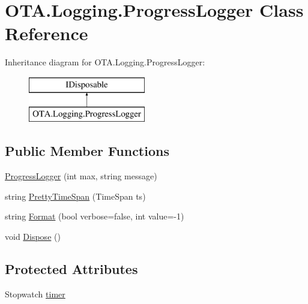 \hypertarget{class_o_t_a_1_1_logging_1_1_progress_logger}{}\section{O\+T\+A.\+Logging.\+Progress\+Logger Class Reference}
\label{class_o_t_a_1_1_logging_1_1_progress_logger}
Inheritance diagram for O\+T\+A.\+Logging.\+Progress\+Logger\+:\begin{figure}[H]
\begin{center}
\leavevmode
\includegraphics[height=2.000000cm]{class_o_t_a_1_1_logging_1_1_progress_logger}
\end{center}
\end{figure}
\subsection*{Public Member Functions}
\begin{DoxyCompactItemize}
\item 
\hyperlink{class_o_t_a_1_1_logging_1_1_progress_logger_aa52ea660c767acd827be13deef1fba14}{Progress\+Logger} (int max, string message)
\item 
string \hyperlink{class_o_t_a_1_1_logging_1_1_progress_logger_a442e642c90e9ebc2cb585fcad888b36d}{Pretty\+Time\+Span} (Time\+Span ts)
\item 
string \hyperlink{class_o_t_a_1_1_logging_1_1_progress_logger_ad3824caa6aefead3a811b03c17dbea1d}{Format} (bool verbose=false, int value=-\/1)
\item 
void \hyperlink{class_o_t_a_1_1_logging_1_1_progress_logger_a2ac8f3630b87201732790bf5cd216361}{Dispose} ()
\end{DoxyCompactItemize}
\subsection*{Protected Attributes}
\begin{DoxyCompactItemize}
\item 
Stopwatch \hyperlink{class_o_t_a_1_1_logging_1_1_progress_logger_a9c45af0d8924b901b14f8d4e5fdeee36}{timer}
\end{DoxyCompactItemize}
